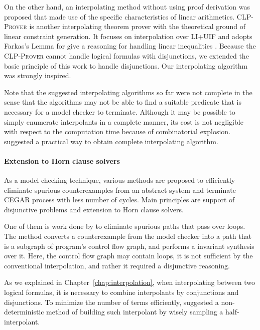 On the other hand, an interpolating method without using proof
derivation was proposed that made use of the specific characteristics
of linear arithmetics.  \textsc{CLP-Prover} \cite{website/clp} is
another interpolating theorem prover with the theoretical ground of
linear constraint generation.  It focuses on interpolation over LI+UIF
and adopts Farkas's Lemma \cite{journals/networks/Rajan90} for give a
reasoning for handling linear
inequalities \cite{conf/vmcai/RybalchenkoS07, conf/cav/Rybalchenko10}.
Because the \textsc{CLP-Prover} cannot handle logical formulas with
disjunctions, we extended the basic principle of this work to handle
disjunctions. Our interpolating algorithm was strongly inspired.

Note that the suggested interpolating algorithms so far were not
complete in the sense that the algorithms may not be able to find a
suitable predicate that is necessary for a model checker to terminate.
Although it may be possible to simply enumerate interpolants in a
complete manner, its cost is not negligible with respect to the
computation time because of combinatorial explosion.
\cite{conf/tacas/JhalaM06} suggested a practical way to
obtain complete interpolating algorithm.

\paragraph{Extension to Horn clause solvers}
As a model checking technique, various methods are proposed to
efficiently eliminate spurious counterexamples from an abstract system
and terminate CEGAR process with less number of cycles.  Main
principles are support of disjunctive problems and extension to Horn
clause solvers.

One of them is work done by \cite{conf/pldi/BeyerHMR07} to eliminate
spurious paths that pass over loops.  The method converts a
counterexample from the model checker into a path that is a subgraph
of program's control flow graph, and performs a invariant synthesis
over it.  Here, the control flow graph may contain loops, it is not
sufficient by the conventional interpolation, and rather it required a
disjunctive reasoning.

As we explained in Chapter~\ref{chap:interpolation}, when
interpolating between two logical formulas, it is necessary to combine
interpolants by conjunctions and disjunctions.  To minimize the number
of terms efficiently, \cite{conf/cav/AlbarghouthiM13} suggested a
non-deterministic method of building such interpolant by wisely
sampling a half-interpolant.


